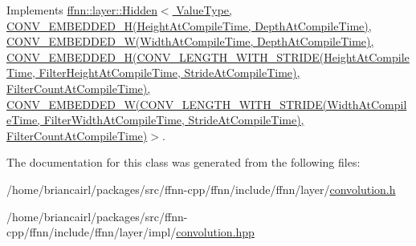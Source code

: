 Implements \hyperlink{classffnn_1_1layer_1_1_hidden_ace039624b0b202413e068fd523f26884}{ffnn\-::layer\-::\-Hidden$<$ Value\-Type, C\-O\-N\-V\-\_\-\-E\-M\-B\-E\-D\-D\-E\-D\-\_\-\-H(\-Height\-At\-Compile\-Time, Depth\-At\-Compile\-Time), C\-O\-N\-V\-\_\-\-E\-M\-B\-E\-D\-D\-E\-D\-\_\-\-W(\-Width\-At\-Compile\-Time, Depth\-At\-Compile\-Time), C\-O\-N\-V\-\_\-\-E\-M\-B\-E\-D\-D\-E\-D\-\_\-\-H(\-C\-O\-N\-V\-\_\-\-L\-E\-N\-G\-T\-H\-\_\-\-W\-I\-T\-H\-\_\-\-S\-T\-R\-I\-D\-E(\-Height\-At\-Compile\-Time, Filter\-Height\-At\-Compile\-Time, Stride\-At\-Compile\-Time), Filter\-Count\-At\-Compile\-Time), C\-O\-N\-V\-\_\-\-E\-M\-B\-E\-D\-D\-E\-D\-\_\-\-W(\-C\-O\-N\-V\-\_\-\-L\-E\-N\-G\-T\-H\-\_\-\-W\-I\-T\-H\-\_\-\-S\-T\-R\-I\-D\-E(\-Width\-At\-Compile\-Time, Filter\-Width\-At\-Compile\-Time, Stride\-At\-Compile\-Time), Filter\-Count\-At\-Compile\-Time)$>$}.



The documentation for this class was generated from the following files\-:\begin{DoxyCompactItemize}
\item 
/home/briancairl/packages/src/ffnn-\/cpp/ffnn/include/ffnn/layer/\hyperlink{convolution_8h}{convolution.\-h}\item 
/home/briancairl/packages/src/ffnn-\/cpp/ffnn/include/ffnn/layer/impl/\hyperlink{convolution_8hpp}{convolution.\-hpp}\end{DoxyCompactItemize}
